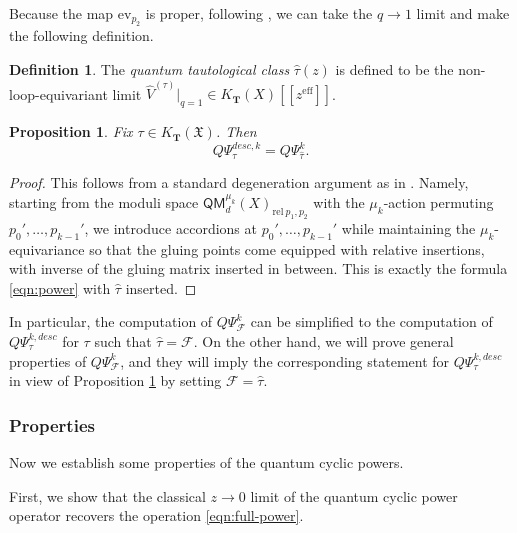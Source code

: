 \documentclass[reqno]{amsart}
\numberwithin{equation}{section}
\numberwithin{equation}{section}
\numberwithin{equation}{section}
\newtheorem{prop}[thm]{Proposition}
\theoremstyle{definition}
\newtheorem{defn}[thm]{Definition}
\theoremstyle{remark}
\theoremstyle{remark}
\begin{document}
Because the map $\mathrm{ev}_{p_2}$ is proper, following \cite[Definition 10]{PSZ-quantum}, we can take the $q \to 1$ limit and make the following definition.
\begin{defn}
    The \emph{quantum tautological class} $\hat{\tau}(z)$ is defined to be the non-loop-equivariant limit $\widehat{V}^{(\tau)} |_{q=1} \in K_{ \mathbf{T}}(X) [\![z^{\mathrm{eff}}]\!]$.
\end{defn}

\begin{prop}\label{prop:qadams-equivalence}
    Fix $\tau \in K_{\mathbf{T}}(\mathfrak{X})$. Then
    \begin{equation}
        Q\Psi^{desc, k}_\tau = Q\Psi^k_{\hat{\tau}}.
    \end{equation} 
\end{prop}
\begin{proof}
    This follows from a standard degeneration argument as in \cite[Proposition 6.5.27]{Oko17}. Namely, starting from the moduli space $\mathsf{QM}_d^{\mu_k}(X)_{\mathrm{rel} \  p_1, p_2}$ with the $\mu_k$-action permuting $p_0', \dots, p_{k-1}'$, we introduce accordions at $p_0', \dots, p_{k-1}'$ while maintaining the $\mu_k$-equivariance so that the gluing points come equipped with relative insertions, with inverse of the gluing matrix inserted in between. This is exactly the formula \eqref{eqn:power} with $\hat{\tau}$ inserted.
\end{proof}

In particular, the computation of $Q\Psi_{\mathcal{F}}^k$ can be simplified to the computation of $Q\Psi^{k, desc}_\tau$ for $\tau$ such that $\hat{\tau} = \mathcal{F}$. On the other hand, we will prove general properties of $Q\Psi_{\mathcal{F}}^k$, and they will imply the corresponding statement for $Q\Psi^{k, desc}_\tau$ in view of Proposition \ref{prop:qadams-equivalence} by setting $\mathcal{F} = \hat{\tau}$.

\subsubsection{Properties}
Now we establish some properties of the quantum cyclic powers.

First, we show that the classical $z \to 0$ limit of the quantum cyclic power operator recovers the operation \eqref{eqn:full-power}.
\end{document}
